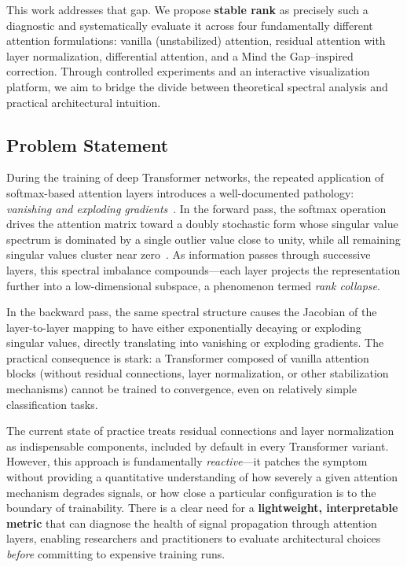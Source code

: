 \documentclass[12pt, a4paper]{article}
\begin{document}
This work addresses that gap. We propose \textbf{stable rank} as precisely
such a diagnostic and systematically evaluate it across four fundamentally
different attention formulations: vanilla (unstabilized) attention, residual
attention with layer normalization, differential attention, and a Mind the
Gap--inspired correction. Through controlled experiments and an interactive
visualization platform, we aim to bridge the divide between theoretical
spectral analysis and practical architectural intuition.

\subsection{Problem Statement}

During the training of deep Transformer networks, the repeated application of
softmax-based attention layers introduces a well-documented pathology:
\textit{vanishing and exploding gradients}~\cite{he2016residual}. In the
forward pass, the softmax operation drives the attention matrix toward a
doubly stochastic form whose singular value spectrum is dominated by a single
outlier value close to unity, while all remaining singular values cluster near
zero~\cite{mind_the_gap}. As information passes through successive layers,
this spectral imbalance compounds---each layer projects the representation
further into a low-dimensional subspace, a phenomenon termed
\textit{rank collapse}.

In the backward pass, the same spectral structure causes the Jacobian of the
layer-to-layer mapping to have either exponentially decaying or exploding
singular values, directly translating into vanishing or exploding gradients.
The practical consequence is stark: a Transformer composed of vanilla attention
blocks (without residual connections, layer normalization, or other
stabilization mechanisms) cannot be trained to convergence, even on relatively
simple classification tasks.

The current state of practice treats residual connections and layer
normalization as indispensable components, included by default in every
Transformer variant. However, this approach is fundamentally
\textit{reactive}---it patches the symptom without providing a quantitative
understanding of how severely a given attention mechanism degrades signals, or
how close a particular configuration is to the boundary of trainability. There
is a clear need for a \textbf{lightweight, interpretable metric} that can
diagnose the health of signal propagation through attention layers, enabling
researchers and practitioners to evaluate architectural choices
\textit{before} committing to expensive training runs.
\end{document}
